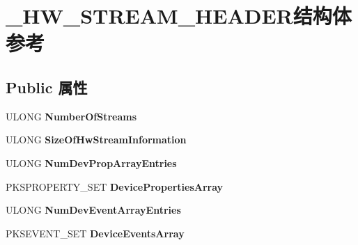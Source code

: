 \hypertarget{struct___h_w___s_t_r_e_a_m___h_e_a_d_e_r}{}\section{\+\_\+\+H\+W\+\_\+\+S\+T\+R\+E\+A\+M\+\_\+\+H\+E\+A\+D\+E\+R结构体 参考}
\label{struct___h_w___s_t_r_e_a_m___h_e_a_d_e_r}
\subsection*{Public 属性}
\begin{DoxyCompactItemize}
\item 
\mbox{\label{struct___h_w___s_t_r_e_a_m___h_e_a_d_e_r_a60b02bd7f1261f0ba679d70723299b21}} 
U\+L\+O\+NG {\bfseries Number\+Of\+Streams}
\item 
\mbox{\label{struct___h_w___s_t_r_e_a_m___h_e_a_d_e_r_a3847534eae9bdbc597778750cda80889}} 
U\+L\+O\+NG {\bfseries Size\+Of\+Hw\+Stream\+Information}
\item 
\mbox{\label{struct___h_w___s_t_r_e_a_m___h_e_a_d_e_r_a0c04d51d69d29a786647a05b02576c7b}} 
U\+L\+O\+NG {\bfseries Num\+Dev\+Prop\+Array\+Entries}
\item 
\mbox{\label{struct___h_w___s_t_r_e_a_m___h_e_a_d_e_r_af356aecd3bc8de1e7281892feef1a2b8}} 
P\+K\+S\+P\+R\+O\+P\+E\+R\+T\+Y\+\_\+\+S\+ET {\bfseries Device\+Properties\+Array}
\item 
\mbox{\label{struct___h_w___s_t_r_e_a_m___h_e_a_d_e_r_aa211475452afdcdfa2bfe644d51a9696}} 
U\+L\+O\+NG {\bfseries Num\+Dev\+Event\+Array\+Entries}
\item 
\mbox{\label{struct___h_w___s_t_r_e_a_m___h_e_a_d_e_r_a6c01976e15c3b03a2631ca6438b8132b}} 
P\+K\+S\+E\+V\+E\+N\+T\+\_\+\+S\+ET {\bfseries Device\+Events\+Array}
\item 
\mbox{\label{struct___h_w___s_t_r_e_a_m___h_e_a_d_e_r_a1535db29edd79c754757d859f6374fa0}} 

\end{DoxyCompactItemize}
